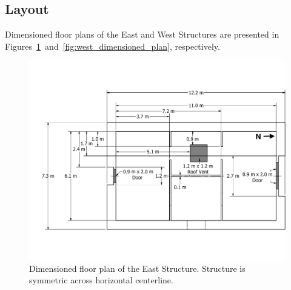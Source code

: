 \documentclass[12pt,oneside]{book}
\begin{document}
\subsection{Layout}
\label{sec:layout}
Dimensioned floor plans of the East and West Structures are presented in Figures~\ref{fig:east_dimensioned_plan}~and~\ref{fig:west_dimensioned_plan}, respectively.

\begin{figure}[!ht]
	\includegraphics[width=\columnwidth]{../Figures/Floor_Plans/East_Structure_Dimensioned_Full}
	\caption[Dimensioned floor plan of the East Structure.]{Dimensioned floor plan of the East Structure. Structure is symmetric across horizontal centerline.}
	\label{fig:east_dimensioned_plan}
\end{figure}
\end{document}
